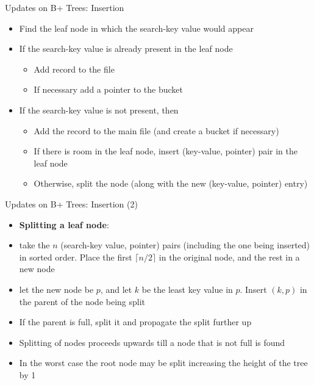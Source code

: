 \documentclass[aspectratio=169, xcolor=dvipsnames]{beamer}
\begin{document}
\begin{frame}{Updates on B+ Trees: Insertion}
    \begin{itemize}[<+->]
        \item Find the leaf node in which the search-key value would appear
        \item If the search-key value is already present in the leaf node
        \begin{itemize}
            \item Add record to the file
            \item If necessary add a pointer to the bucket
        \end{itemize}
        \item If the search-key value is not present, then
        \begin{itemize}
            \item Add the record to the main file (and create a bucket if necessary)
            \item If there is room in the leaf node, insert (key-value, pointer) pair in the leaf node
            \item Otherwise, split the node (along with the new (key-value, pointer) entry)
        \end{itemize}
    \end{itemize}
\end{frame}

\begin{frame}{Updates on B+ Trees: Insertion (2)}
    \begin{itemize}[<+->]
        \item \textbf{Splitting a leaf node}:
        \item take the $n$ (search-key value, pointer) pairs (including the one being inserted) in sorted order. Place the first $\lceil n/2 \rceil$ in the original node, and the rest in a new node
        \item let the new node be $p$, and let $k$ be the least key value in $p$. Insert $(k, p)$ in the parent of the node being split
        \item If the parent is full, split it and propagate the split further up
        \item Splitting of nodes proceeds upwards till a node that is not full is found
        \item In the worst case the root node may be split increasing the height of the tree by 1
    \end{itemize}
\end{frame}
\end{document}
